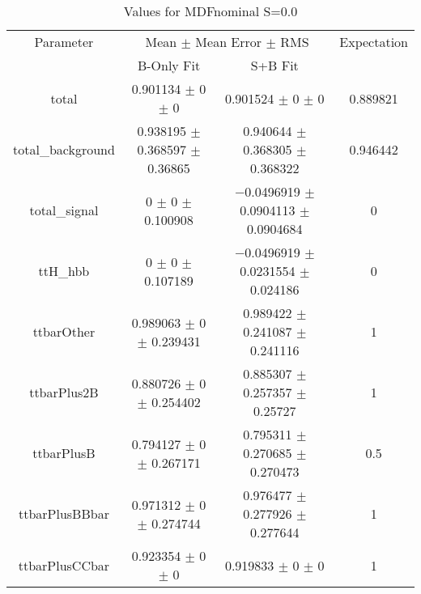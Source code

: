 \begin{table}
\centering
\caption{Values for MDFnominal S=0.0}
\begin{tabular}{cccc}
\toprule
Parameter & \multicolumn{2}{c}{Mean $\pm$ Mean Error $\pm$ RMS} & Expectation\\
 & B-Only Fit & S+B Fit & \\
\midrule
total & \num{0.901134} $\pm$ \num{0} $\pm$ \num{0} & \num{0.901524} $\pm$ \num{0} $\pm$ \num{0} & \num{0.889821}\\
total\_background & \num{0.938195} $\pm$ \num{0.368597} $\pm$ \num{0.36865} & \num{0.940644} $\pm$ \num{0.368305} $\pm$ \num{0.368322} & \num{0.946442}\\
total\_signal & \num{0} $\pm$ \num{0} $\pm$ \num{0.100908} & \num{-0.0496919} $\pm$ \num{0.0904113} $\pm$ \num{0.0904684} & \num{0}\\
ttH\_hbb & \num{0} $\pm$ \num{0} $\pm$ \num{0.107189} & \num{-0.0496919} $\pm$ \num{0.0231554} $\pm$ \num{0.024186} & \num{0}\\
ttbarOther & \num{0.989063} $\pm$ \num{0} $\pm$ \num{0.239431} & \num{0.989422} $\pm$ \num{0.241087} $\pm$ \num{0.241116} & \num{1}\\
ttbarPlus2B & \num{0.880726} $\pm$ \num{0} $\pm$ \num{0.254402} & \num{0.885307} $\pm$ \num{0.257357} $\pm$ \num{0.25727} & \num{1}\\
ttbarPlusB & \num{0.794127} $\pm$ \num{0} $\pm$ \num{0.267171} & \num{0.795311} $\pm$ \num{0.270685} $\pm$ \num{0.270473} & \num{0.5}\\
ttbarPlusBBbar & \num{0.971312} $\pm$ \num{0} $\pm$ \num{0.274744} & \num{0.976477} $\pm$ \num{0.277926} $\pm$ \num{0.277644} & \num{1}\\
ttbarPlusCCbar & \num{0.923354} $\pm$ \num{0} $\pm$ \num{0} & \num{0.919833} $\pm$ \num{0} $\pm$ \num{0} & \num{1}\\
\bottomrule
\end{tabular}
\end{table}